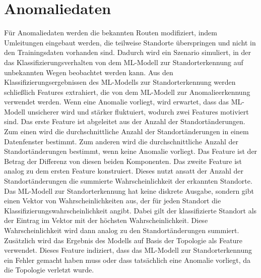 \section{Anomaliedaten}
\label{sec:data_anomalie}
Für Anomaliedaten werden die bekannten Routen modifiziert, indem Umleitungen eingebaut werden, die teilweise Standorte überspringen
und nicht in den Trainingsdaten vorhanden sind.
Dadurch wird ein Szenario simuliert, in der das Klassifizierungsverhalten von dem ML-Modell zur Standorterkennung auf unbekannten Wegen beobachtet werden kann.
Aus den Klassifizierungsergebnissen des ML-Modells zur Standorterkennung werden schließlich Features extrahiert,
die von dem ML-Modell zur Anomalieerkennung verwendet werden.
\newline
\newline
Wenn eine Anomalie vorliegt, wird erwartet, dass das ML-Modell unsicherer wird und stärker fluktuiert,
wodurch zwei Features motiviert sind.
Das erste Feature ist abgeleitet aus der Anzahl der Standortänderungen.
Zum einen wird die durchschnittliche Anzahl der Standortänderungen in einem Datenfenster bestimmt.
Zum anderen wird die durchschnittliche Anzahl der Standortänderungen bestimmt, wenn keine Anomalie vorliegt.
Das Feature ist der Betrag der Differenz von diesen beiden Komponenten.
\newline
\newline
Das zweite Feature ist analog zu dem ersten Feature konstruiert.
Dieses nutzt ansatt der Anzahl der Standortänderungen die summierte Wahrscheinlichkeit der erkannten Standorte.
Das ML-Modell zur Standorterkennung hat keine diskrete Ausgabe, sondern gibt einen Vektor von Wahrscheinlichkeiten aus,
der für jeden Standort die Klassifizierungswahrscheinlichkeit angibt.
Dabei gilt der klassifizierte Standort als der Eintrag im Vektor mit der höchsten Wahrscheinlichkeit.
Diese Wahrscheinlichkeit wird dann analog zu den Standortänderungen summiert.
\newline
\newline
Zusätzlich wird das Ergebnis des Modells auf Basis der Topologie als Feature verwendet.
Dieses Feature indiziert, dass das ML-Modell zur Standorterkennung ein Fehler gemacht haben muss
oder dass tatsächlich eine Anomalie vorliegt, da die Topologie verletzt wurde.
